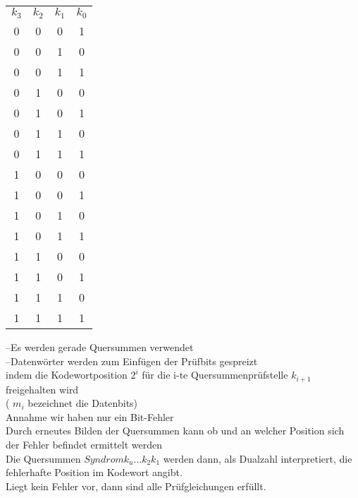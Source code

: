 \documentclass[a4paper]{scrartcl}
\begin{document}
						\begin{table}[h]
							\centering
							\begin{tabular}{c c c c}
								\(k_3\) &\(k_2\) & \(k_1\)& \( k_0 \)\\
								0&0&0&1\\
								0&0&1&0\\
								0&0&1&1\\
								0&1&0&0\\
								0&1&0&1\\
								0&1&1&0\\
								0&1&1&1\\
								1&0&0&0\\
								1&0&0&1\\
								1&0&1&0\\
								1&0&1&1\\
								1&1&0&0\\
								1&1&0&1\\
								1&1&1&0\\
								1&1&1&1\\
							\end{tabular}
						\end{table}
					
					--Es werden gerade Quersummen verwendet\\
					--Datenwörter werden zum Einfügen der Prüfbits gespreizt\\
					indem die Kodewortposition \( 2^i \) für die i-te Quersummenprüfstelle \( k_{i+1} \) freigehalten wird \\
					( \( m_i  \) bezeichnet die Datenbits)\\
					
					Annahme wir haben nur ein Bit-Fehler\\
					Durch erneutes Bilden der Quersummen kann ob und an welcher Position sich der Fehler befindet ermittelt werden \\
					Die Quersummen \( Syndrom k_u \dots k_2 k_1 \) werden dann, als Dualzahl interpretiert, die fehlerhafte Position im Kodewort angibt.\\
					Liegt kein Fehler vor,
					dann sind alle Prüfgleichungen erfüllt.\\
					
					\paragraph{Hammingkode mit 4 Datenbits und 3 Prüfbits, also 7-Bit-Kodewörter}
					\emph{Datenwort:} 1101
					\begin{align*}
						&\implies xxxxxxx&\\
						&\implies 1_{m_4} 1_{m_3} 0_{m_2} k_3^{2^2} 1_{m_1}  k_2^{2^1} k_1^{2^0}&\\
					\end{align*}
					
\end{document}
